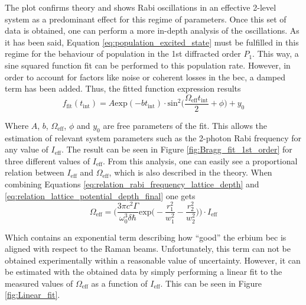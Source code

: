 The plot confirms theory and shows Rabi oscillations in an effective 2-level system as a predominant effect for this regime of parameters. Once this set of data is obtained, one can perform a more in-depth analysis of the oscillations. As it has been said, Equation \ref{eq:population_excited_state} must be fulfilled in this regime for the behaviour of population in the 1st diffracted order $P_1$. This way, a sine squared function fit can be performed to this population rate. However, in order to account for factors like noise or coherent losses in the \ac{bec}, a damped term has been added. Thus, the fitted function expression results
\begin{equation}
	f_\text{fit}(t_\text{int}) = A \text{exp}(-b t_\text{int}) \cdot \text{sin}^2\bigg(\frac{\Omega_\text{eff}t_\text{int}}{2} +\phi\bigg) + y_0
\end{equation}

Where $A$, $b$, $\Omega_\text{eff}$, $\phi$ and $y_0$ are free parameters of the fit. This allows the estimation of relevant system parameters such as the 2-photon Rabi frequency for any value of $I_\text{eff}$. The result can be seen in Figure \ref{fig:Bragg_fit_1st_order} for three different values of $I_\text{eff}$. From this analysis, one can easily see a proportional relation between $I_\text{eff}$ and $\Omega_\text{eff}$, which is also described in the theory. When combining Equations \eqref{eq:relation_rabi_frequency_lattice_depth} and \eqref{eq:relation_lattice_potential_depth_final} one gets
\begin{equation}\label{eq:relation_Ieff_omega_eff}
	\Omega_\text{eff} = \Bigg(\frac{3 \pi c^2 \Gamma}{\omega_0^3 \delta \hbar} \text{exp}\bigg(-\frac{r_1^2}{w_1^2}-\frac{r_2^2}{w_2^2}\bigg)\Bigg) \cdot I_\text{eff}
\end{equation}

Which contains an exponential term describing how ``good'' the erbium \ac{bec} is aligned with respect to the Raman beams. Unfortunately, this term can not be obtained experimentally within a reasonable value of uncertainty. However, it can be estimated with the obtained data by simply performing a linear fit to the measured values of $\Omega_\text{eff}$ as a function of $I_\text{eff}$. This can be seen in Figure \ref{fig:Linear_fit}.


